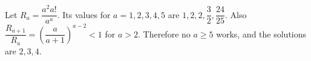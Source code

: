 Let $R_a=\dfrac{a^2a!}{a^a}$. Its values for $a=1,2,3,4,5$ are $1,2,2,\dfrac{3}{2},\dfrac{24}{25}$. Also $\dfrac{R_{a+1}}{R_a}=\left(\dfrac{a}{a+1}\right)^{a-2}<1$ for $a>2$. Therefore no $a\ge5$ works, and the solutions are $\boxed{2,3,4}$.
